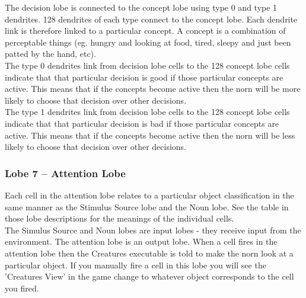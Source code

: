 \documentclass[11pt,twoside,a4paper]{article}
\begin{document}
\clearpage


The decision lobe is connected to the concept lobe using type 0 and type 1 dendrites. 128 dendrites of each type connect to the concept lobe. Each dendrite link is therefore linked to a particular concept. A concept is a combination of perceptable things (eg. hungry and looking at food, tired, sleepy and just been patted by the hand, etc).~\\

The type 0 dendrites link from decision lobe cells to the 128 concept lobe cells indicate that that particular decision is good if those particular concepts are active. This means that if the concepts become active then the norn will be more likely to choose that decision over other decisions.~\\

The type 1 dendrites link from decision lobe cells to the 128 concept lobe cells indicate that that particular decision is bad if those particular concepts are active. This means that if the concepts become active then the norn will be less likely to choose that decision over other decisions.


\subsubsection{Lobe 7 -- Attention Lobe}

Each cell in the attention lobe relates to a particular object classification in the same manner as the Stimulus Source lobe and the Noun lobe. See the table in those lobe descriptions for the meanings of the individual cells.~\\

The Simulus Source and Noun lobes are input lobes - they receive input from the environment. The attention lobe is an output lobe. When a cell fires in the attention lobe then the Creatures executable is told to make the norn look at a particular object. If you manually fire a cell in this lobe you will see the 'Creatures View' in the game change to whatever object corresponds to the cell you fired.~\\
\end{document}
